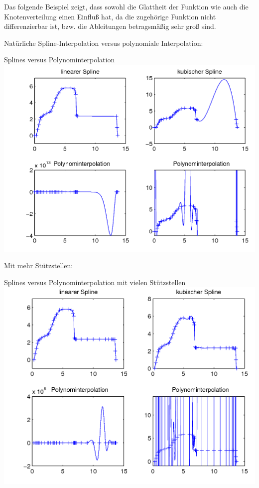 \begin{Bspe}[Laster]\label{5.2.20}
  Das folgende Beispiel zeigt,
  dass sowohl die Glattheit der Funktion
  wie auch die Knotenverteilung einen Einfluß hat,
  da die zugehörige Funktion nicht differenzierbar ist,
  bzw. die Ableitungen betragsmäßig sehr groß sind.
  
  Natürliche Spline-Interpolation
  versus polynomiale Interpolation:
  \begin{image}{Splines versus Polynominterpolation}
    \includegraphics[width=\linewidth]{images/laster1.png}
  \end{image}\label{6.2.19(1)}

  Mit mehr Stützstellen:
  \begin{image}{Splines versus Polynominterpolation
      mit vielen Stützstellen}
    \includegraphics[width=\linewidth]{images/laster2.png} 
  \end{image}\label{6.2.19(2)}
\end{Bspe}

